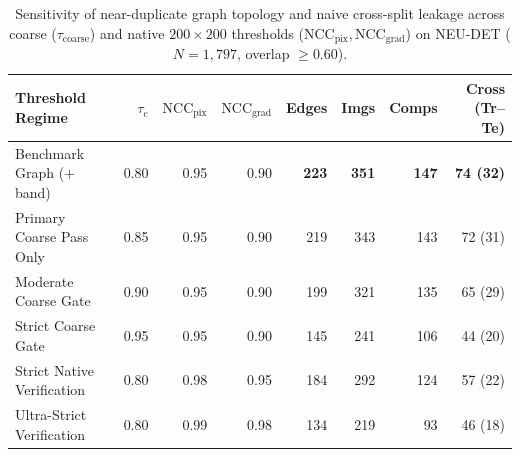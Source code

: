 \documentclass[pdflatex,sn-apa]{sn-jnl}
\begin{document}
\begin{table}[htbp]
\centering
\footnotesize
\setlength{\tabcolsep}{2.5pt}
\caption{Sensitivity of near-duplicate graph topology and naive cross-split leakage across coarse ($\tau_{\text{coarse}}$) and native $200\times 200$ thresholds ($\text{NCC}_{\text{pix}}, \text{NCC}_{\text{grad}}$) on NEU-DET ($N=1,797$, overlap $\ge 0.60$).}
\label{tab:threshold_sensitivity}
\begin{tabularx}{\textwidth}{>{\raggedright\arraybackslash}X r r r r r r r}
\toprule
\textbf{Threshold Regime} & $\tau_{\text{c}}$ & $\text{NCC}_{\text{pix}}$ & $\text{NCC}_{\text{grad}}$ & \textbf{Edges} & \textbf{Imgs} & \textbf{Comps} & \textbf{Cross (Tr--Te)} \\
\midrule
Benchmark Graph ($+$band) & 0.80 & 0.95 & 0.90 & \textbf{223} & \textbf{351} & \textbf{147} & \textbf{74 (32)} \\
Primary Coarse Pass Only & 0.85 & 0.95 & 0.90 & 219 & 343 & 143 & 72 (31) \\
Moderate Coarse Gate & 0.90 & 0.95 & 0.90 & 199 & 321 & 135 & 65 (29) \\
Strict Coarse Gate & 0.95 & 0.95 & 0.90 & 145 & 241 & 106 & 44 (20) \\
\midrule
Strict Native Verification & 0.80 & 0.98 & 0.95 & 184 & 292 & 124 & 57 (22) \\
Ultra-Strict Verification & 0.80 & 0.99 & 0.98 & 134 & 219 & 93 & 46 (18) \\
\bottomrule
\end{tabularx}
\end{table}
\end{document}

